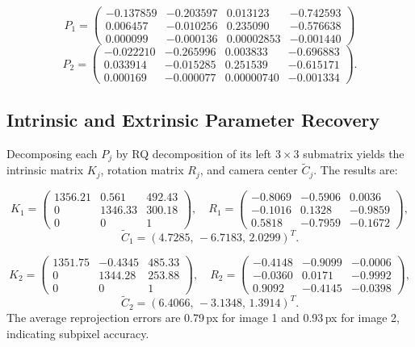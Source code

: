 \[
P_1 = \begin{pmatrix}
-0.137859 & -0.203597 & 0.013123 & -0.742593 \\
 0.006457 & -0.010256 & 0.235090 & -0.576638 \\
 0.000099 & -0.000136 & 0.00002853 & -0.001440
\end{pmatrix}
\]
\[
P_2 = \begin{pmatrix}
-0.022210 & -0.265996 & 0.003833 & -0.696883 \\
 0.033914 & -0.015285 & 0.251539 & -0.615171 \\
 0.000169 & -0.000077 & 0.00000740 & -0.001334
\end{pmatrix}.
\]

\subsection{Intrinsic and Extrinsic Parameter Recovery}
Decomposing each $P_j$ by RQ decomposition of its left $3\times3$ submatrix yields the intrinsic matrix $K_j$, rotation matrix $R_j$, and camera center $\tilde C_j$. The results are:

\[
K_1 = \begin{pmatrix}
1356.21 & 0.561 & 492.43 \\
0 & 1346.33 & 300.18 \\
0 & 0 & 1
\end{pmatrix},
\quad
R_1 = \begin{pmatrix}
-0.8069 & -0.5906 & 0.0036 \\
-0.1016 & 0.1328 & -0.9859 \\
 0.5818 & -0.7959 & -0.1672
\end{pmatrix},
\]
\[
\tilde C_1 = (4.7285,\,-6.7183,\,2.0299)^T.
\]

\[
K_2 = \begin{pmatrix}
1351.75 & -0.4345 & 485.33 \\
0 & 1344.28 & 253.88 \\
0 & 0 & 1
\end{pmatrix},
\quad
R_2 = \begin{pmatrix}
-0.4148 & -0.9099 & -0.0006 \\
-0.0360 & 0.0171 & -0.9992 \\
 0.9092 & -0.4145 & -0.0398
\end{pmatrix},
\]
\[
\tilde C_2 = (6.4066,\,-3.1348,\,1.3914)^T.
\]
The average reprojection errors are 0.79\,px for image 1 and 0.93\,px for image 2, indicating subpixel accuracy.